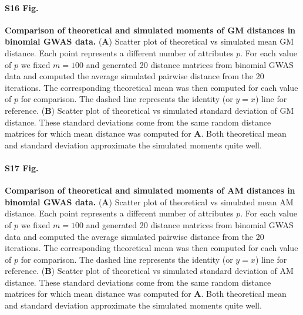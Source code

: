 \documentclass[10pt,letterpaper]{article}
\begin{document}
\paragraph*{S16 Fig.}
\hypertarget{S16_Fig}{
{\bf Comparison of theoretical and simulated moments of GM distances in binomial GWAS data.} (\textbf{A}) Scatter plot of theoretical vs simulated mean GM distance. Each point represents a different number of attributes $p$. For each value of $p$ we fixed $m=100$ and generated 20 distance matrices from binomial GWAS data and computed the average simulated pairwise distance from the 20 iterations. The corresponding theoretical mean was then computed for each value of $p$ for comparison. The dashed line represents the identity (or $y=x$) line for reference. (\textbf{B}) Scatter plot of theoretical vs simulated standard deviation of GM distance. These standard deviations come from the same random distance matrices for which mean distance was computed for \textbf{A}. Both theoretical mean and standard deviation approximate the simulated moments quite well.}

\paragraph*{S17 Fig.}
\hypertarget{S17_Fig}{
{\bf Comparison of theoretical and simulated moments of AM distances in binomial GWAS data.} (\textbf{A}) Scatter plot of theoretical vs simulated mean AM distance. Each point represents a different number of attributes $p$. For each value of $p$ we fixed $m=100$ and generated 20 distance matrices from binomial GWAS data and computed the average simulated pairwise distance from the 20 iterations. The corresponding theoretical mean was then computed for each value of $p$ for comparison. The dashed line represents the identity (or $y=x$) line for reference. (\textbf{B}) Scatter plot of theoretical vs simulated standard deviation of AM distance. These standard deviations come from the same random distance matrices for which mean distance was computed for \textbf{A}. Both theoretical mean and standard deviation approximate the simulated moments quite well.}
\end{document}
